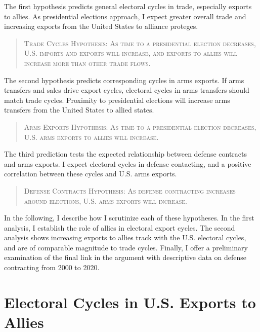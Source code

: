 \documentclass[12pt]{article}
\begin{document}
The first hypothesis predicts general electoral cycles in trade, especially exports to allies. 
As presidential elections approach, I expect greater overall trade and increasing exports from the United States to alliance proteges.


\begin{quote}
\textsc{Trade Cycles Hypothesis: As time to a presidential election decreases, U.S. imports and exports will increase, and exports to allies will increase more than other trade flows.}
\end{quote}



The second hypothesis predicts corresponding cycles in arms exports.
If arms transfers and sales drive export cycles, electoral cycles in arms transfers should match trade cycles.
Proximity to presidential elections will increase arms transfers from the United States to allied states. 


\begin{quote}
\textsc{Arms Exports Hypothesis: As time to a presidential election decreases, U.S. arms exports to allies will increase.}
\end{quote}


The third prediction tests the expected relationship between defense contracts and arms exports. 
I expect electoral cycles in defense contacting, and a positive correlation between these cycles and U.S. arms exports.


\begin{quote}
\textsc{Defense Contracts Hypothesis: As defense contracting increases around elections, U.S. arms exports will increase.}
\end{quote}



In the following, I describe how I scrutinize each of these hypotheses. 
In the first analysis, I establish the role of allies in electoral export cycles. 
The second analysis shows increasing exports to allies track with the U.S. electoral cycles, and are of comparable magnitude to trade cycles.
Finally, I offer a preliminary examination of the final link in the argument with descriptive data on defense contracting from 2000 to 2020.




\section{Electoral Cycles in U.S. Exports to Allies}
\end{document}
